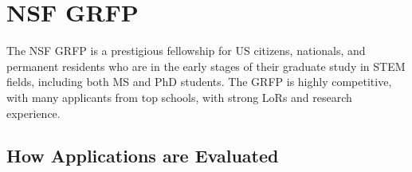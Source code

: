 \documentclass[oneside,11pt,dvipsnames]{book}
\newenvironment{commentbox}[1][]{
  \small
  \begin{mybox}
    {\small \textbf{#1}}
  }{
  \end{mybox}
}
\begin{document}



    

\section{NSF GRFP}\label{sec:nsf-grfp}

The NSF GRFP is a prestigious fellowship for US citizens, nationals, and permanent residents who are in the early stages of their graduate study in STEM fields, including both MS and PhD students. The GRFP is highly competitive, with many applicants from top schools, with strong LoRs and research experience.



\subsection{How Applications are Evaluated}
\end{document}
